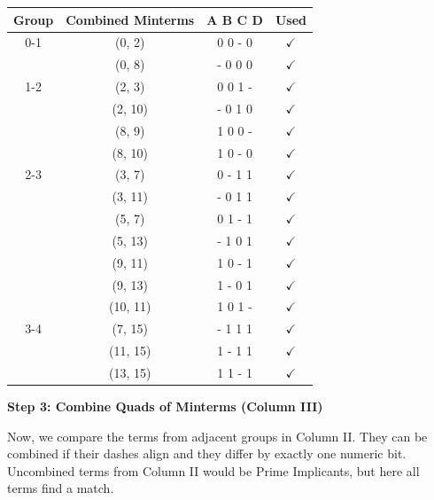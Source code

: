 \documentclass[12pt,a3paper]{article}
\begin{document}
\begin{enumerate}
\begin{tcolorbox}[enhanced,breakable,ansbox,colback=cC!4,colframe=cC,boxrule=0.8pt,arc=5pt,title={\textbf{Answer}},fonttitle=\bfseries\color{white},colbacktitle=cC]
\begin{center}
\begin{tabular}{cccc}
\toprule
\textbf{Group} & \textbf{Combined Minterms} & \textbf{A B C D} & \textbf{Used} \\
\midrule
0-1 & (0, 2) & 0 0 - 0 & $\checkmark$ \\
    & (0, 8) & - 0 0 0 & $\checkmark$ \\
\midrule
1-2 & (2, 3) & 0 0 1 - & $\checkmark$ \\
    & (2, 10) & - 0 1 0 & $\checkmark$ \\
    & (8, 9) & 1 0 0 - & $\checkmark$ \\
    & (8, 10) & 1 0 - 0 & $\checkmark$ \\
\midrule
2-3 & (3, 7) & 0 - 1 1 & $\checkmark$ \\
    & (3, 11) & - 0 1 1 & $\checkmark$ \\
    & (5, 7) & 0 1 - 1 & $\checkmark$ \\
    & (5, 13) & - 1 0 1 & $\checkmark$ \\
    & (9, 11) & 1 0 - 1 & $\checkmark$ \\
    & (9, 13) & 1 - 0 1 & $\checkmark$ \\
    & (10, 11)& 1 0 1 - & $\checkmark$ \\
\midrule
3-4 & (7, 15) & - 1 1 1 & $\checkmark$ \\
    & (11, 15)& 1 - 1 1 & $\checkmark$ \\
    & (13, 15)& 1 1 - 1 & $\checkmark$ \\
\bottomrule
\end{tabular}
\end{center}

\vspace{1em}
\textbf{\large Step 3: Combine Quads of Minterms (Column III)}

Now, we compare the terms from adjacent groups in Column II. They can be combined if their dashes align and they differ by exactly one numeric bit. Uncombined terms from Column II would be Prime Implicants, but here all terms find a match.


\end{tcolorbox}
\end{enumerate}
\end{document}
